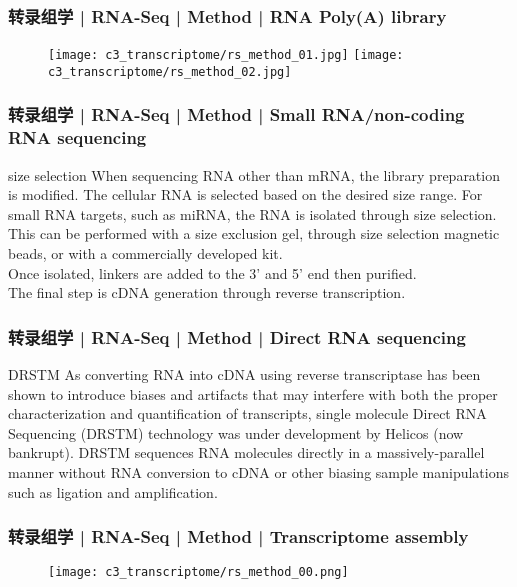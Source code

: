 \begin{frame}
  \frametitle{转录组学 | RNA-Seq | Method | RNA Poly(A) library}
  \begin{figure}
    \centering
    \texttt{[image: c3\_transcriptome/rs\_method\_01.jpg]}
    \texttt{[image: c3\_transcriptome/rs\_method\_02.jpg]}
  \end{figure}
\end{frame}

\begin{frame}
  \frametitle{转录组学 | RNA-Seq | Method | Small RNA/non-coding RNA sequencing}
  \begin{block}{size selection}
 When sequencing RNA other than mRNA, the library preparation is modified. The cellular RNA is selected based on the desired size range. For small RNA targets, such as miRNA, the RNA is isolated through size selection. This can be performed with a size exclusion gel, through size selection magnetic beads, or with a commercially developed kit.\\
 \vspace{1em}
 Once isolated, linkers are added to the 3' and 5' end then purified.\\
 \vspace{1em}
 The final step is cDNA generation through reverse transcription. 
  \end{block}
\end{frame}

\begin{frame}
  \frametitle{转录组学 | RNA-Seq | Method | Direct RNA sequencing}
  \begin{block}{DRSTM}
  As converting RNA into cDNA using reverse transcriptase has been shown to introduce biases and artifacts that may interfere with both the proper characterization and quantification of transcripts, single molecule Direct RNA Sequencing (DRSTM) technology was under development by Helicos (now bankrupt). DRSTM sequences RNA molecules directly in a massively-parallel manner without RNA conversion to cDNA or other biasing sample manipulations such as ligation and amplification.
  \end{block}
\end{frame}

\begin{frame}
  \frametitle{转录组学 | RNA-Seq | Method | Transcriptome assembly}
  \begin{figure}
    \centering
    \texttt{[image: c3\_transcriptome/rs\_method\_00.png]}
  \end{figure}
\end{frame}

